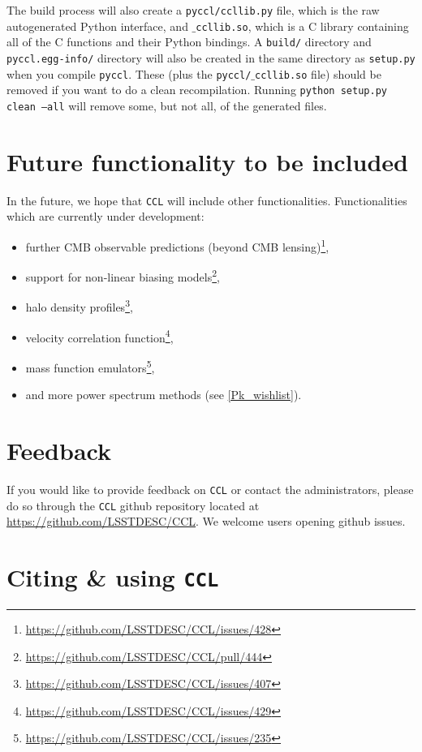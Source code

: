 \documentclass[\docopts]{\docclass}
\newcommand{\ccl}{{\tt CCL}\xspace}
\begin{document}
The build process will also create a {\tt pyccl/ccllib.py} file, which is the raw autogenerated Python interface, and {\tt $\_$ccllib.so}, which is a C library containing all of the C functions and their Python bindings. A {\tt build/} directory and {\tt pyccl.egg-info/} directory will also be created in the same directory as {\tt setup.py} when you compile {\tt pyccl}. These (plus the {\tt pyccl/$\_$ccllib.so} file) should be removed if you want to do a clean recompilation. Running {\tt python setup.py clean --all} will remove some, but not all, of the generated files.


\section{Future functionality to be included}
\label{sec:future}

In the future, we hope that \ccl will include other functionalities. Functionalities which are currently under development:
\begin{itemize}
\item further CMB observable predictions (beyond CMB lensing)\footnote{\url{https://github.com/LSSTDESC/CCL/issues/428}},
\item support for non-linear biasing models\footnote{\url{https://github.com/LSSTDESC/CCL/pull/444}}\citep[e.g.][]{FASTPT},
\item halo density profiles\footnote{\url{https://github.com/LSSTDESC/CCL/issues/407}},
\item velocity correlation function\footnote{\url{https://github.com/LSSTDESC/CCL/issues/429}},
\item mass function emulators\footnote{\url{https://github.com/LSSTDESC/CCL/issues/235}},
\item and more power spectrum methods (see \ref{Pk_wishlist}).
\end{itemize}

\section{Feedback}
\label{sec:feedback}

If you would like to provide feedback on \ccl or contact the administrators, please do so through the \ccl github repository located at \url{https://github.com/LSSTDESC/CCL}. We welcome users opening github issues.

\section{Citing \& using \ccl}
\label{sec:cite}
\end{document}

